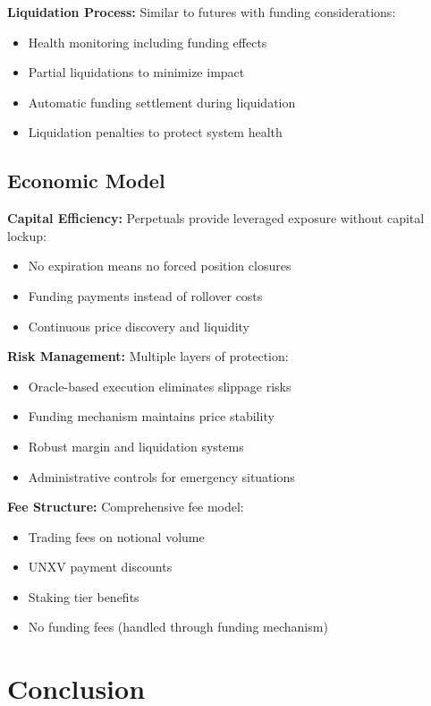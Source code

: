 \documentclass[12pt]{article}
\begin{document}
\begin{itemize}
\textbf{Liquidation Process:} Similar to futures with funding considerations:
\begin{itemize}
    \item Health monitoring including funding effects
    \item Partial liquidations to minimize impact
    \item Automatic funding settlement during liquidation
    \item Liquidation penalties to protect system health
\end{itemize}

\subsection{Economic Model}

\textbf{Capital Efficiency:} Perpetuals provide leveraged exposure without capital lockup:
\begin{itemize}
    \item No expiration means no forced position closures
    \item Funding payments instead of rollover costs
    \item Continuous price discovery and liquidity
\end{itemize}

\textbf{Risk Management:} Multiple layers of protection:
\begin{itemize}
    \item Oracle-based execution eliminates slippage risks
    \item Funding mechanism maintains price stability
    \item Robust margin and liquidation systems
    \item Administrative controls for emergency situations
\end{itemize}

\textbf{Fee Structure:} Comprehensive fee model:
\begin{itemize}
    \item Trading fees on notional volume
    \item UNXV payment discounts
    \item Staking tier benefits
    \item No funding fees (handled through funding mechanism)
\end{itemize}

\section{Conclusion}


\end{itemize}
\end{document}
